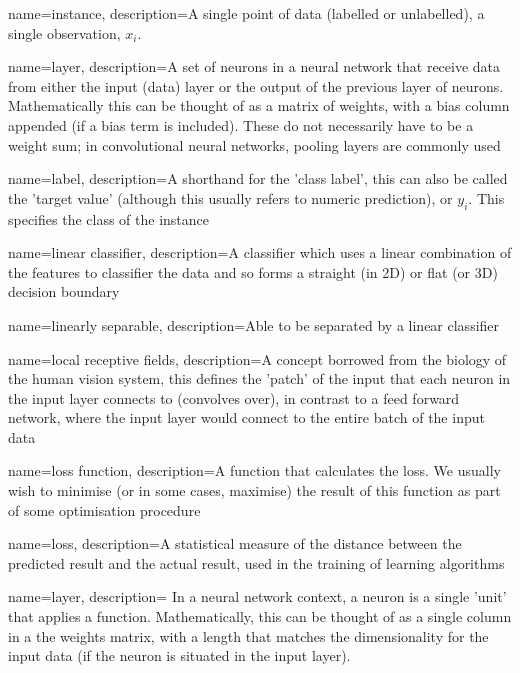 {
    name={instance},
    description={A single point of data (labelled or unlabelled), a single observation, $x_i$.}
}


{
    name=layer,
    description={A set of neurons in a neural network that receive data from either the input (data) layer or the output of the previous layer of neurons. Mathematically this can be thought of as a matrix of weights, with a bias column appended (if a bias term is included). These do not necessarily have to be a weight sum; in convolutional neural networks, pooling layers are commonly used} 
}

{
    name=label,
    description={A shorthand for the 'class label', this can also be called the 'target value' (although this usually refers to numeric prediction), or $y_i$. This specifies the class of the instance}
}

{
    name=linear classifier,
    description={A classifier which uses a linear combination of the features to classifier the data and so forms a straight (in 2D) or flat (or 3D) decision boundary}
}

{
    name=linearly separable,
    description={Able to be separated by a linear classifier}
}

{
    name=local receptive fields,
    description={A concept borrowed from the biology of the human vision system, this defines the 'patch' of the input that each neuron in the input layer connects to (convolves over), in contrast to a feed forward network, where the input layer would connect to the entire batch of the input data}
}

{
    name=loss function,
    description={A function that calculates the loss. We usually wish to minimise (or in some cases, maximise) the result of this function as part of some optimisation procedure}
}

{
    name=loss,
    description={A statistical measure of the distance between the predicted result and the actual result, used in the training of learning algorithms}
}

{
    name=layer,
    description={ In a neural network context, a neuron is a single 'unit' that applies a function. Mathematically, this can be thought of as a single column in a the weights matrix, with a length that matches the dimensionality for the input data (if the neuron is situated in the input layer).  } 
}

